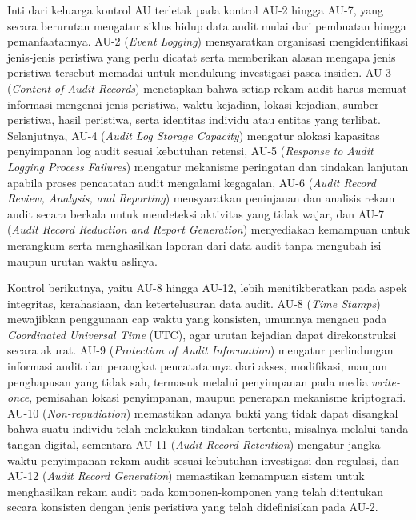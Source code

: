 Inti dari keluarga kontrol AU terletak pada kontrol AU-2 hingga AU-7, yang secara berurutan mengatur siklus hidup data audit mulai dari pembuatan hingga pemanfaatannya. AU-2 (\textit{Event Logging}) mensyaratkan organisasi mengidentifikasi jenis-jenis peristiwa yang perlu dicatat serta memberikan alasan mengapa jenis peristiwa tersebut memadai untuk mendukung investigasi pasca-insiden. AU-3 (\textit{Content of Audit Records}) menetapkan bahwa setiap rekam audit harus memuat informasi mengenai jenis peristiwa, waktu kejadian, lokasi kejadian, sumber peristiwa, hasil peristiwa, serta identitas individu atau entitas yang terlibat. Selanjutnya, AU-4 (\textit{Audit Log Storage Capacity}) mengatur alokasi kapasitas penyimpanan log audit sesuai kebutuhan retensi, AU-5 (\textit{Response to Audit Logging Process Failures}) mengatur mekanisme peringatan dan tindakan lanjutan apabila proses pencatatan audit mengalami kegagalan, AU-6 (\textit{Audit Record Review, Analysis, and Reporting}) mensyaratkan peninjauan dan analisis rekam audit secara berkala untuk mendeteksi aktivitas yang tidak wajar, dan AU-7 (\textit{Audit Record Reduction and Report Generation}) menyediakan kemampuan untuk merangkum serta menghasilkan laporan dari data audit tanpa mengubah isi maupun urutan waktu aslinya.

Kontrol berikutnya, yaitu AU-8 hingga AU-12, lebih menitikberatkan pada aspek integritas, kerahasiaan, dan ketertelusuran data audit. AU-8 (\textit{Time Stamps}) mewajibkan penggunaan cap waktu yang konsisten, umumnya mengacu pada \textit{Coordinated Universal Time} (UTC), agar urutan kejadian dapat direkonstruksi secara akurat. AU-9 (\textit{Protection of Audit Information}) mengatur perlindungan informasi audit dan perangkat pencatatannya dari akses, modifikasi, maupun penghapusan yang tidak sah, termasuk melalui penyimpanan pada media \textit{write-once}, pemisahan lokasi penyimpanan, maupun penerapan mekanisme kriptografi. AU-10 (\textit{Non-repudiation}) memastikan adanya bukti yang tidak dapat disangkal bahwa suatu individu telah melakukan tindakan tertentu, misalnya melalui tanda tangan digital, sementara AU-11 (\textit{Audit Record Retention}) mengatur jangka waktu penyimpanan rekam audit sesuai kebutuhan investigasi dan regulasi, dan AU-12 (\textit{Audit Record Generation}) memastikan kemampuan sistem untuk menghasilkan rekam audit pada komponen-komponen yang telah ditentukan secara konsisten dengan jenis peristiwa yang telah didefinisikan pada AU-2.

